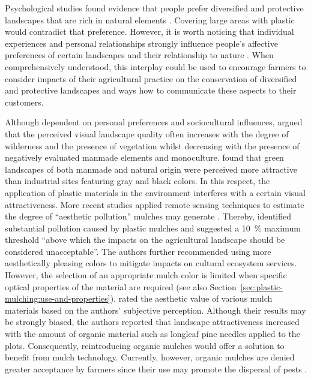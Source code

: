 Psychological studies found evidence that people prefer diversified and protective landscapes that are rich in natural elements \citep[for example,][]{KaplanRestorative1995,LohrResponses2006}. Covering large areas with plastic would contradict that preference. However, it is worth noticing that individual experiences and personal relationships strongly influence people's affective preferences of certain landscapes and their relationship to nature \citep[for example,][]{HunzikerSpace2007,StrumseDemographic1996}. When comprehensively understood, this interplay could be used to encourage farmers to consider impacts of their agricultural practice on the conservation of diversified and protective landscapes and ways how to communicate these aspects to their customers.

Although dependent on personal preferences and sociocultural influences, \citet{ArriazaAssessing2004} argued that the perceived visual landscape quality often increases with the degree of wilderness and the presence of vegetation whilst decreasing with the presence of negatively evaluated manmade elements and monoculture.  found that green landscapes of both manmade and natural origin were perceived more attractive than industrial sites featuring gray and black colors. In this respect, the application of plastic materials in the environment interferes with a certain visual attractiveness. More recent studies applied remote sensing techniques to estimate the degree of ``aesthetic pollution'' mulches may generate \citep{LevinRemote2007,PicunoAnalysis2011}. Thereby, \citet{PicunoAnalysis2011} identified substantial pollution caused by plastic mulches and suggested a \SI{10}{\percent} maximum threshold ``above which the impacts on the agricultural landscape should be considered unacceptable''. The authors further recommended using more aesthetically pleasing colors to mitigate impacts on cultural ecosystem services. However, the selection of an appropriate mulch color is limited when specific optical properties of the material are required (see also Section~\ref{sec:plastic-mulching:use-and-properties}).  rated the aesthetic value of various mulch materials based on the authors' subjective perception.
Although their results may be strongly biased, the authors reported that landscape attractiveness increased with the amount of organic material such as longleaf pine needles applied to the plots. Consequently, reintroducing organic mulches would offer a solution to benefit from mulch technology. Currently, however, organic mulches are denied greater acceptance by farmers \citep{GoldbergerBarriers2015} since their use may promote the dispersal of pests \citep{HowardOrganic1998}.

